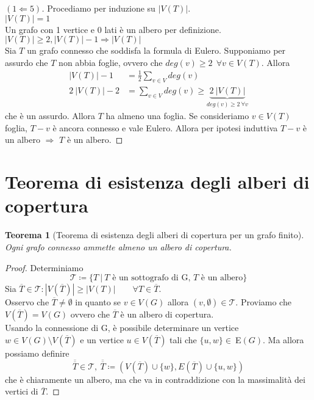 \documentclass[12pt,twoscolu]{article}
\newcommand{\implica}{\Longrightarrow}
\renewcommand\qedsymbol{$\blacksquare$}
\newcommand{\Eps}{$E\:$}
\newcommand{\MathEps}{E}
\newcommand{\baseinduzalbero}[1]{\\[1\baselineskip]{\boldmath$ |V(T)| = #1$}}
\newcommand{\induzalbero}[1]{\\[1\baselineskip]{\boldmath$|V(T)| \ge #1, |V(T)| -1 \implica |V(T)|$}}
\newtheorem{theorem}{Teorema}
\begin{document}
\renewcommand\qedsymbol{$\blacksquare$}
\begin{proof}[$(1 \Longleftarrow 5)$]
Procediamo per induzione su $|V(T)|$.
\baseinduzalbero{1}
\\ Un grafo con 1 vertice e 0 lati è un albero per definizione.
\induzalbero{2}\nopagebreak
\\ Sia $T$ un grafo connesso che soddisfa la formula di Eulero. Supponiamo per assurdo che $T$ non abbia foglie, ovvero che $deg(v) \ge 2 \ \ \forall v \in V(T)$. Allora
\begin{align*}
|V(T)| - 1 &= \frac{1}{2} \sum_{v \in V} deg(v) \\ 
2\ |V(T) | -2 &= \sum_{v \in V} deg(v) \ge \underbrace{2 \ |V(T)|}_{deg(v) \ge 2 \ \forall v}
\end{align*}
che è un assurdo. Allora $T$ ha almeno una foglia. Se consideriamo $v \in V(T)$ foglia, $T-v$ è ancora connesso e vale Eulero. Allora per ipotesi induttiva $T - v$ è un albero $\implica$ $T$ è un albero.
\end{proof}

\section{Teorema di esistenza degli alberi di copertura}
\begin{theorem}[Teorema di esistenza degli alberi di copertura per un grafo finito]
Ogni grafo connesso ammette almeno un albero di copertura.
\end{theorem}

\begin{proof}
Determiniamo
$$ \mathcal{T} \coloneqq \{ T \ | \ \text{$T$ è un sottografo di G, $T$ è un albero} \}$$
Sia $\overline{T} \in \mathcal{T} : |V(\overline{T}) | \ge |V(T)| \qquad \forall T \in \overline{T}$.
\\Osservo che $\overline{T} \ne \emptyset$ in quanto se $v \in V(G)$ allora $(v, \emptyset) \in \mathcal{T}$. Proviamo che $V(\overline{T}) = V(G)$ ovvero che $\overline{T}$ è un albero di copertura.\\
Usando la connessione di G, è possibile determinare un vertice $w \in V(G) \setminus V(\overline{T})$ e un vertice $u \in V(\overline{T})$ tali che $\{u, w\} \in\  \Eps(G)$. Ma allora possiamo definire
$$ \overline{\overline{T}} \in \mathcal{T},\ \overline{\overline{T}} \coloneqq(V(\overline{T}) \cup \{w\}, \MathEps (\overline{T}) \cup \{u, w\})$$
che è chiaramente un albero, ma che va in contraddizione con la massimalità dei vertici di $\overline{T}$.
\end{proof} 
\end{document}
